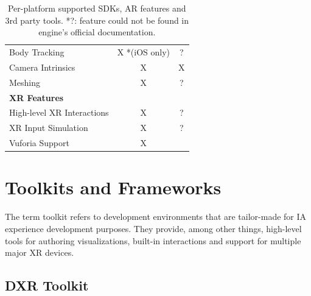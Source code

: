 \documentclass{vgtc}                          %
\begin{document}
\begin{table}[ht!]
\begin{tabular}{l c c}
		Body Tracking                 & X *(iOS only)                         & ?                        \\
		Camera Intrinsics             & X                                     & X                        \\
		Meshing                       & X                                     & ?                        \\
		\midrule
		\textbf{XR Features}          &                                       &                          \\
		\midrule
		High-level XR Interactions    & X                                     & ?                        \\
		XR Input Simulation           & X                                     & ?                        \\
		\midrule
		Vuforia Support               & X                                     &                          \\
		\bottomrule
	\end{tabular}


	\medskip

	\caption{Per-platform supported SDKs, AR features and 3rd party tools. *?:
		feature could not be found in engine's official documentation.}
	\label{table:1}
\end{table}

\section{Toolkits and Frameworks}

The term toolkit refers to development environments that are tailor-made for
IA experience development purposes. They provide, among other things,
high-level tools for authoring visualizations, built-in interactions and
support for multiple major XR devices.

\subsection{DXR Toolkit}
\end{document}

